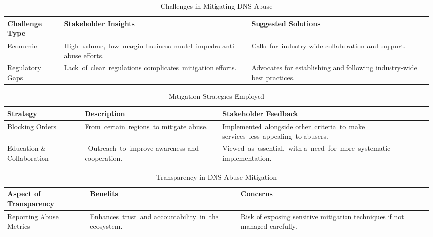 {

\begin{table}[H]
\centering
\footnotesize 
\begin{tabular}{|l|p{4cm}|p{4cm}|}
\hline
\cellcolor{gray!50}\textbf{Challenge Type} & 
\cellcolor{gray!50}\textbf{Stakeholder Insights} & 
\cellcolor{gray!50}\textbf{Suggested Solutions} \\
\hline
Economic & \mbox {High volume, low margin} \mbox {business model impedes} anti-abuse efforts. & \mbox {Calls for industry-wide} collaboration and support. \\
\hline
Regulatory Gaps & \mbox {Lack of clear regulations} \mbox {complicates mitigation} efforts. & Advocates for establishing and following industry-wide best practices. \\
\hline
\end{tabular}
\caption{Challenges in Mitigating DNS Abuse}
\label{table:challenges_in_mitigation}
\end{table}


}

{

\begin{table}[H]
\centering
\footnotesize 
\begin{tabular}{|l|p{4cm}|p{4cm}|}
\hline
\cellcolor{gray!50}\textbf{Strategy} & 
\cellcolor{gray!50}\textbf{Description} & 
\cellcolor{gray!50}\textbf{Stakeholder Feedback} \\
\hline
Blocking Orders & \mbox {From certain regions to} mitigate abuse. & \mbox {Implemented alongside} \mbox {other criteria to make} \mbox {services less appealing to} abusers. \\
\hline
Education \& Collaboration & \mbox { Outreach to improve} awareness and cooperation. & \mbox {Viewed as essential, with} \mbox {a need for more systematic} implementation. \\
\hline
\end{tabular}
\caption{Mitigation Strategies Employed}
\label{table:mitigation_strategies}
\end{table}

}

{
\begin{table}[H]
\centering
\footnotesize 
\begin{tabular}{|l|p{4cm}|p{4cm}|}
\hline
\cellcolor{gray!50}\textbf{Aspect of Transparency} & 
\cellcolor{gray!50}\textbf{Benefits} 
& \cellcolor{gray!50}\textbf{Concerns} \\
\hline
Reporting Abuse Metrics & \mbox {Enhances trust and} \mbox {accountability in the} ecosystem. & Risk of exposing sensitive mitigation techniques if not managed carefully. \\
\hline
\end{tabular}
\caption{Transparency in DNS Abuse Mitigation}
\label{table:transparency_in_mitigation}
\end{table}


}

